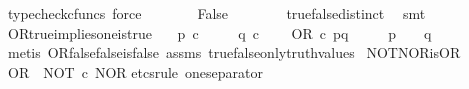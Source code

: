 \begin{isabellebody}
\ {\isacharparenleft}{\kern0pt}typecheck{\isacharunderscore}{\kern0pt}cfuncs{\isacharcomma}{\kern0pt}\ force{\isacharparenright}{\kern0pt}\isanewline
\ \ \ \ \isamarkupfalse%
\ \isamarkupfalse%
\ False\isanewline
\ \ \ \ \ \ \isamarkupfalse%
\ true{\isacharunderscore}{\kern0pt}false{\isacharunderscore}{\kern0pt}distinct\ \isamarkupfalse%
\ smt\isanewline
{}\isamarkupfalse%
%
\endisatagproof
{\isafoldproof}%
%
\isadelimproof
\isanewline
%
\endisadelimproof
\isanewline
{}\isamarkupfalse%
\ OR{\isacharunderscore}{\kern0pt}true{\isacharunderscore}{\kern0pt}implies{\isacharunderscore}{\kern0pt}one{\isacharunderscore}{\kern0pt}is{\isacharunderscore}{\kern0pt}true{\isacharcolon}{\kern0pt}\isanewline
\ \ \ {\isachardoublequoteopen}p\ {\isasymin}\isactrlsub c\ {\isasymOmega}{\isachardoublequoteclose}\ \isanewline
\ \ \ {\isachardoublequoteopen}q\ {\isasymin}\isactrlsub c\ {\isasymOmega}{\isachardoublequoteclose}\isanewline
\ \ \ {\isachardoublequoteopen}OR\ {\isasymcirc}\isactrlsub c\ {\isasymlangle}p{\isacharcomma}{\kern0pt}q{\isasymrangle}\ {\isacharequal}{\kern0pt}\ {\isasymt}{\isachardoublequoteclose}\isanewline
\ \ \ {\isachardoublequoteopen}{\isacharparenleft}{\kern0pt}p\ {\isacharequal}{\kern0pt}\ {\isasymt}{\isacharparenright}{\kern0pt}\ {\isasymor}\ {\isacharparenleft}{\kern0pt}q\ {\isacharequal}{\kern0pt}\ {\isasymt}{\isacharparenright}{\kern0pt}{\isachardoublequoteclose}\isanewline
%
\isadelimproof
\ \ %
\endisadelimproof
%
\isatagproof
{}\isamarkupfalse%
\ {\isacharparenleft}{\kern0pt}metis\ OR{\isacharunderscore}{\kern0pt}false{\isacharunderscore}{\kern0pt}false{\isacharunderscore}{\kern0pt}is{\isacharunderscore}{\kern0pt}false\ assms\ true{\isacharunderscore}{\kern0pt}false{\isacharunderscore}{\kern0pt}only{\isacharunderscore}{\kern0pt}truth{\isacharunderscore}{\kern0pt}values{\isacharparenright}{\kern0pt}%
\endisatagproof
{\isafoldproof}%
%
\isadelimproof
\isanewline
%
\endisadelimproof
\isanewline
{}\isamarkupfalse%
\ NOT{\isacharunderscore}{\kern0pt}NOR{\isacharunderscore}{\kern0pt}is{\isacharunderscore}{\kern0pt}OR{\isacharcolon}{\kern0pt}\isanewline
\ {\isachardoublequoteopen}OR\ {\isacharequal}{\kern0pt}\ NOT\ {\isasymcirc}\isactrlsub c\ NOR{\isachardoublequoteclose}\isanewline
%
\isadelimproof
%
\endisadelimproof
%
\isatagproof
{}\isamarkupfalse%
{\isacharparenleft}{\kern0pt}etcs{\isacharunderscore}{\kern0pt}rule\ one{\isacharunderscore}{\kern0pt}separator{\isacharparenright}{\kern0pt}\isanewline

\end{isabellebody}

